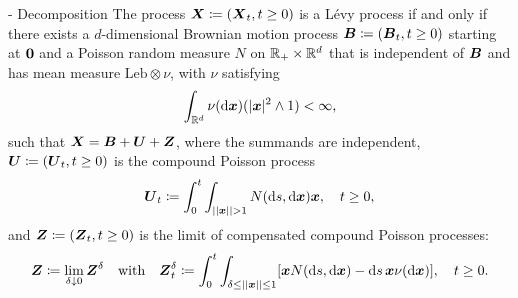\begin{thm}{\Levy{}-\Ito{} Decomposition}{}
	The process $\boldsymbol{X} \coloneqq (\boldsymbol{X}_t, t \ge 0)$ is a Lévy process if and only if there exists a $d$-dimensional Brownian motion process $\boldsymbol{B} \coloneqq (\boldsymbol{B}_t, t \ge 0)$ starting at $\boldsymbol{0}$ and a Poisson random measure $N$ on $\mathbb{R}_+ \times \mathbb{R}^d$ that is independent of $\boldsymbol{B}$ and has mean measure $\text{Leb} \otimes \nu$, with $\nu$ satisfying
	\begin{equation}
		\int_{\mathbb{R}^d} \nu(\mathrm{d} \boldsymbol{x}) (|\boldsymbol{x}|^2 \wedge 1) < \infty,
		\label{eq:LevyMeasureCondition}
	\end{equation}
	such that $\boldsymbol{X} = \boldsymbol{B} + \boldsymbol{U} + \boldsymbol{Z}$, where the summands are independent, $\boldsymbol{U} \coloneqq (\boldsymbol{U}_t, t \ge 0)$ is the compound Poisson process
	\begin{equation*}
		\boldsymbol{U}_t \coloneqq \int_0^t \int_{||\boldsymbol{x}|| > 1} N(\mathrm{d} s, \mathrm{d} \boldsymbol{x}) \boldsymbol{x}, \quad t \ge 0,
	\end{equation*}
	and $\boldsymbol{Z} \coloneqq (\boldsymbol{Z}_t, t \ge 0)$ is the limit of compensated compound Poisson processes:
	\begin{equation*}
		\boldsymbol{Z} \coloneqq \lim_{\delta \downarrow 0} \boldsymbol{Z}^{\delta} \quad \text{with} \quad \boldsymbol{Z}^{\delta}_t \coloneqq \int_0^t \int_{\delta \le ||\boldsymbol{x}|| \le 1} [\boldsymbol{x} N(\mathrm{d} s, \mathrm{d} \boldsymbol{x}) - \mathrm{d} s \, \boldsymbol{x} \nu(\mathrm{d} \boldsymbol{x})], \quad t \ge 0.
	\end{equation*}
\end{thm}
